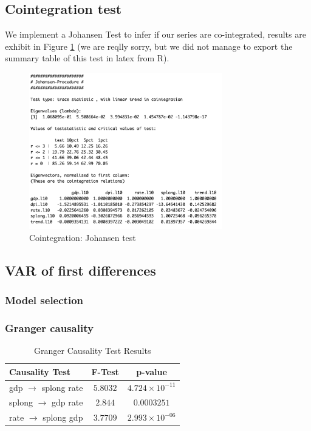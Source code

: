 \documentclass[hidelinks,12pts]{article}
\DeclareMathOperator{\1}{\mathbbm{1}}
\begin{document}
\subsection{Cointegration test}

We implement a Johansen Test to infer if our series are co-integrated, results are exhibit in Figure \ref{fig:coint} (we are reqlly sorry, but we did not manage to export the summary table of this test in latex from R). 


\begin{figure}[h!]
    \centering
    \includegraphics*[width=0.75\textwidth]{IMAGES/coint_test.png}
    \caption{Cointegration: Johansen test}
    \label{fig:coint}
\end{figure}


\subsection{VAR of first differences}

    \subsubsection{Model selection}

    

    

    \subsubsection{Granger causality}


\begin{table}[htbp]
    \centering
    \caption{Granger Causality Test Results}
    \begin{tabular}{|l|c|c|}
    \toprule
    \textbf{Causality Test} & \textbf{F-Test} & \textbf{p-value} \\
    \midrule
    gdp $\rightarrow$ splong rate & $5.8032$ & $4.724 \times 10^{-11}$ \\
    splong $\rightarrow$ gdp rate & $2.844$ & $0.0003251$ \\
    rate $\rightarrow$ splong gdp & $3.7709$ & $2.993 \times 10^{-06}$ \\
    \bottomrule
    \end{tabular}
    \label{tab:granger_results}
\end{table}
\end{document}
